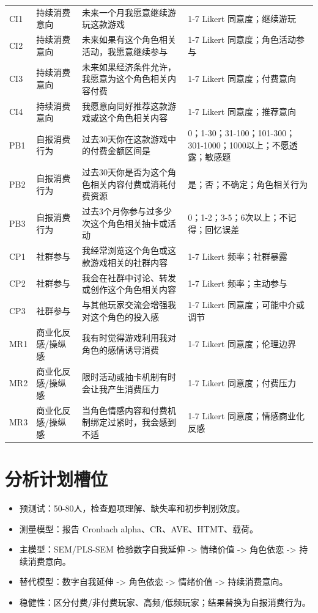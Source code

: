 \documentclass[UTF8,zihao=-4]{ctexart}
\begin{document}
\begin{longtable}{p{1.4cm}p{2.5cm}p{7.5cm}p{3.2cm}}
CI1 & 持续消费意向 & 未来一个月我愿意继续游玩这款游戏 & 1-7 Likert 同意度；继续游玩 \\
CI2 & 持续消费意向 & 未来如果有这个角色相关活动，我愿意继续参与 & 1-7 Likert 同意度；角色活动参与 \\
CI3 & 持续消费意向 & 未来如果经济条件允许，我愿意为这个角色相关内容付费 & 1-7 Likert 同意度；付费意向 \\
CI4 & 持续消费意向 & 我愿意向同好推荐这款游戏或这个角色相关内容 & 1-7 Likert 同意度；推荐意向 \\
PB1 & 自报消费行为 & 过去30天你在这款游戏中的付费金额区间是 & 0；1-30；31-100；101-300；301-1000；1000以上；不愿透露；敏感题 \\
PB2 & 自报消费行为 & 过去30天你是否为这个角色相关内容付费或消耗付费资源 & 是；否；不确定；角色相关行为 \\
PB3 & 自报消费行为 & 过去3个月你参与过多少次这个角色相关抽卡或活动 & 0；1-2；3-5；6次以上；不记得；回忆误差 \\
CP1 & 社群参与 & 我经常浏览这个角色或这款游戏相关的社群内容 & 1-7 Likert 频率；社群暴露 \\
CP2 & 社群参与 & 我会在社群中讨论、转发或创作这个角色相关内容 & 1-7 Likert 频率；主动参与 \\
CP3 & 社群参与 & 与其他玩家交流会增强我对这个角色的投入感 & 1-7 Likert 同意度；可能中介或调节 \\
MR1 & 商业化反感/操纵感 & 我有时觉得游戏利用我对角色的感情诱导消费 & 1-7 Likert 同意度；伦理边界 \\
MR2 & 商业化反感/操纵感 & 限时活动或抽卡机制有时会让我产生消费压力 & 1-7 Likert 同意度；付费压力 \\
MR3 & 商业化反感/操纵感 & 当角色情感内容和付费机制绑定过紧时，我会感到不适 & 1-7 Likert 同意度；情感商业化反感 \\
\bottomrule\end{longtable}
\section{分析计划槽位}
\begin{itemize}
\item 预测试：50-80人，检查题项理解、缺失率和初步判别效度。
\item 测量模型：报告 Cronbach alpha、CR、AVE、HTMT、载荷。
\item 主模型：SEM/PLS-SEM 检验数字自我延伸 -> 情绪价值 -> 角色依恋 -> 持续消费意向。
\item 替代模型：数字自我延伸 -> 角色依恋 -> 情绪价值 -> 持续消费意向。
\item 稳健性：区分付费/非付费玩家、高频/低频玩家；结果替换为自报消费行为。
\end{itemize}
\end{document}
